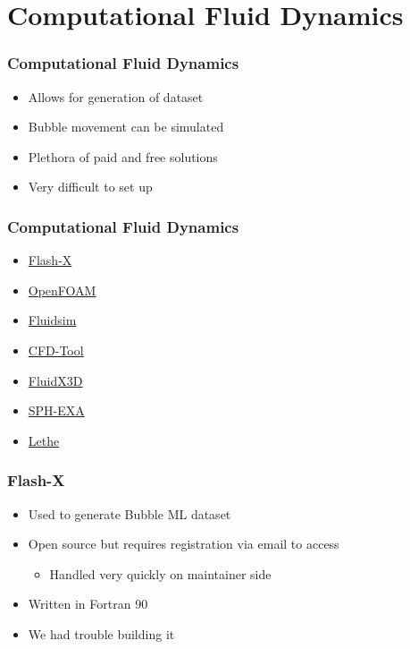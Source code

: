 \documentclass{beamer}
\begin{document}
\section{Computational Fluid Dynamics}

\begin{frame}
    \frametitle{Computational Fluid Dynamics}
    \begin{itemize}
        \item Allows for generation of dataset
        \item Bubble movement can be simulated
        \item Plethora of paid and free solutions
        \item Very difficult to set up
    \end{itemize}
\end{frame}

\begin{frame}
    \frametitle{Computational Fluid Dynamics}
    \begin{itemize}
        \item \href{https://flash-x.org/}{Flash-X}
        \item \href{https://www.openfoam.com/}{OpenFOAM}
        \item \href{https://fluidsim.readthedocs.io/en/latest/}{Fluidsim}
        \item \href{https://www.cfdtool.com/}{CFD-Tool}
        \item \href{https://github.com/ProjectPhysX/FluidX3D}{FluidX3D}
        \item \href{https://github.com/unibas-dmi-hpc/SPH-EXA}{SPH-EXA}
        \item \href{https://www.sciencedirect.com/science/article/pii/S2352711020302922}{Lethe}
    \end{itemize}
\end{frame}

\begin{frame}
    \frametitle{Flash-X}
    \begin{itemize}
        \item Used to generate Bubble ML dataset
        \item Open source but requires registration via email to access
            \begin{itemize}
                \item Handled very quickly on maintainer side
            \end{itemize}
        \item Written in Fortran 90
        \item We had trouble building it
    \end{itemize}
\end{frame}
\end{document}
